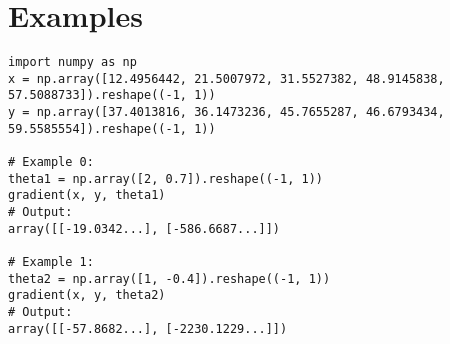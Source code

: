 \section*{Examples}

\begin{verbatim}
import numpy as np
x = np.array([12.4956442, 21.5007972, 31.5527382, 48.9145838, 57.5088733]).reshape((-1, 1))
y = np.array([37.4013816, 36.1473236, 45.7655287, 46.6793434, 59.5585554]).reshape((-1, 1))

# Example 0:
theta1 = np.array([2, 0.7]).reshape((-1, 1))
gradient(x, y, theta1)
# Output:
array([[-19.0342...], [-586.6687...]])

# Example 1:
theta2 = np.array([1, -0.4]).reshape((-1, 1))
gradient(x, y, theta2)
# Output:
array([[-57.8682...], [-2230.1229...]])
\end{verbatim}